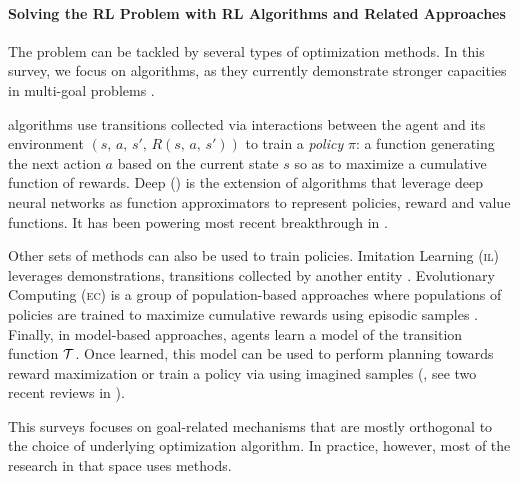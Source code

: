\paragraph{Solving the RL Problem with RL Algorithms and Related Approaches}
The \rl problem can be tackled by several types of optimization methods. In this survey, we focus on \rl
algorithms, as they currently demonstrate stronger capacities in multi-goal problems \cite{goalgan,eysenbach2018diversity,warde2018unsupervised,pong2019skew,lynch2020grounding,hill_human_2020,hill_grounded_2020,abramson_imitating_2020,imagine,team2021open}.

\rl algorithms use transitions collected via interactions between the agent and its environment $(s,\,a,\,s',\,R(s,\,a,\,s'))$ to train a \textit{policy} $\pi$: a function generating the next action $a$ based on the current state $s$ so as to maximize a cumulative function of rewards. Deep \rl  (\drl) is the extension of \rl algorithms that leverage deep neural networks as function approximators to represent policies, reward and value functions. It has been powering most recent breakthrough in \rl  \cite{eysenbach2018diversity,warde2018unsupervised,goalgan,pong2019skew,lynch2020grounding,hill_human_2020,hill_grounded_2020,abramson_imitating_2020,imagine,team2021open}.

Other sets of methods can also be used to train policies. Imitation Learning (\textsc{il}) leverages demonstrations, \ie transitions collected by another entity \cite{ho2016generative,hester2018deep}. Evolutionary Computing (\textsc{ec}) is a group of population-based approaches where populations of policies are trained to maximize cumulative rewards using episodic samples \cite{sehnke2010parameter,lehman2011evolving,wierstra2014natural,mouret2015illuminating,salimans2017evolution,imgep,colas2020scaling}. Finally, in model-based \rl approaches, agents learn a model of the transition function $\mathcal{T}$. Once learned, this model can be used to perform planning towards reward maximization or train a policy via \rl using imagined samples (\eg \cite{schmidhuber_making_1990,dayan_helmholtz_1995,nguyen-tuong_model_2011,chua2018deep,charlesworth2020plangan,schrittwieser_mastering_2020}, see two recent reviews in \cite{hamrick_role_2020,moerland_intersection_2021}).

This surveys focuses on goal-related mechanisms that are mostly orthogonal to the choice of underlying
optimization algorithm. In practice, however, most of the research in that space uses \drl methods.

